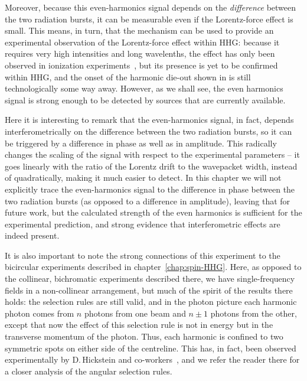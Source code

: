 Moreover, because this even-harmonics signal depends on the \textit{difference} between the two radiation bursts, it can be measurable even if the Lorentz-force effect is small. This means, in turn, that the mechanism can be used to provide an experimental observation of the Lorentz-force effect within HHG: because it requires very high intensities and long wavelenths, the effect has only been observed in ionization experiments~\cite{smeenk_partitioning_2011, ludwig_breakdown_2014}, but its presence is yet to be confirmed within HHG, and the onset of the harmonic die-out shown in  is still technologically some way away. However, as we shall see, the even harmonics signal is strong enough to be detected by sources that are currently available.


Here it is interesting to remark that the even-harmonics signal, in fact, depends interferometrically on the difference between the two radiation bursts, so it can be triggered by a difference in phase as well as in amplitude. This radically changes the scaling of the signal with respect to the experimental parameters -- it goes linearly with the ratio of the Lorentz drift to the wavepacket width, instead of quadratically, making it much easier to detect. In this chapter we will not explicitly trace the even-harmonics signal to the difference in phase between the two radiation bursts (as opposed to a difference in amplitude), leaving that for future work, but the calculated strength of the even harmonics is sufficient for the experimental prediction, and strong evidence that interferometric effects are indeed present.




It is also important to note the strong connections of this experiment to the bicircular experiments described in chapter~\ref{chap:spin-HHG}. Here, as opposed to the collinear, bichromatic experiments described there, we have single-frequency fields in a non-collinear arrangement, but much of the spirit of the results there holds: the selection rules are still valid, and in the photon picture each harmonic photon comes from $n$ photons from one beam and $n\pm1$ photons from the other, except that now the effect of this selection rule is not in energy but in the transverse momentum of the photon. Thus, each harmonic is confined to two symmetric spots on either side of the centreline. This has, in fact, been observed experimentally by D.\,Hickstein and co-workers~\cite{hickstein_non-collinear_2015}, and we refer the reader there for a closer analysis of the angular selection rules.


